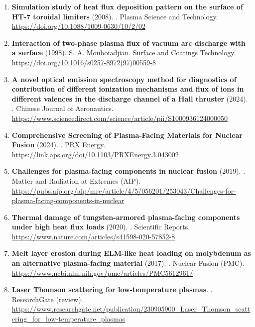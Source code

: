 \documentclass[11pt,a4paper]{article}
\begin{document}
\begin{enumerate}[leftmargin=1.4em]
\item \textbf{Simulation study of heat flux deposition pattern on the surface of HT-7 toroidal limiters} (2008). . Plasma Science and Technology. \url{https://doi.org/10.1088/1009-0630/10/2/02}
\item \textbf{Interaction of two-phase plasma flux of vacuum arc discharge with a surface} (1998). S. A. Mouboiadjian. Surface and Coatings Technology. \url{https://doi.org/10.1016/s0257-8972(97)00559-8}
\item \textbf{A novel optical emission spectroscopy method for diagnostics of contribution of different ionization mechanisms and flux of ions in different valences in the discharge channel of a Hall thruster} (2024). . Chinese Journal of Aeronautics. \url{https://www.sciencedirect.com/science/article/pii/S1000936124000050}
\item \textbf{Comprehensive Screening of Plasma-Facing Materials for Nuclear Fusion} (2024). . PRX Energy. \url{https://link.aps.org/doi/10.1103/PRXEnergy.3.043002}
\item \textbf{Challenges for plasma-facing components in nuclear fusion} (2019). . Matter and Radiation at Extremes (AIP). \url{https://pubs.aip.org/aip/mre/article/4/5/056201/253043/Challenges-for-plasma-facing-components-in-nuclear}
\item \textbf{Thermal damage of tungsten-armored plasma-facing components under high heat flux loads} (2020). . Scientific Reports. \url{https://www.nature.com/articles/s41598-020-57852-8}
\item \textbf{Melt layer erosion during ELM-like heat loading on molybdenum as an alternative plasma-facing material} (2017). . Nuclear Fusion (PMC). \url{https://www.ncbi.nlm.nih.gov/pmc/articles/PMC5612961/}
\item \textbf{Laser Thomson scattering for low-temperature plasmas}. . ResearchGate (review). \url{https://www.researchgate.net/publication/230905900_Laser_Thomson_scattering_for_low-temperature_plasmas}
\end{enumerate}
\end{document}
